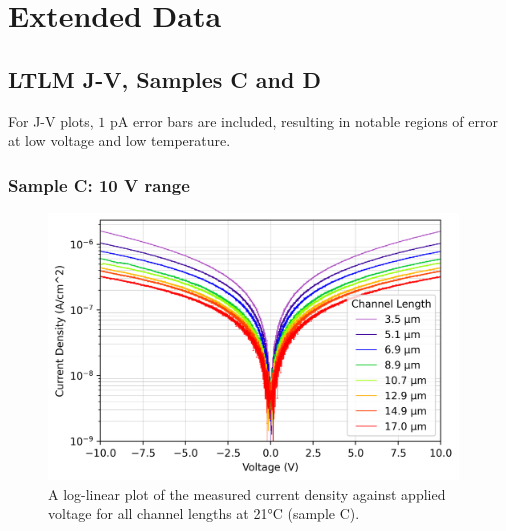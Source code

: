 \chapter{Extended Data}

\section{LTLM J-V, Samples C and D}
For J-V plots, $1$ \si{\pico\ampere} error bars are included, resulting in notable regions of error at low voltage and low temperature.
\label{app:LTLM_J_V_data}
\subsection{Sample C: 10 \si{\volt} range}
\label{app:J_V_sample_C}
\begin{figure}[h]
    \centering
    \includegraphics[width=0.97\textwidth]{Chapter6/Figs/Raster/Sample C 2019/10V_Current_Density_vs_Voltage_Temperature_21_log.png}
    \caption{A log-linear plot of the measured current density against applied voltage for all channel lengths at 21\si{\degreeCelsius} (sample C).}
    \label{appfig:current_density_21}
\end{figure}

